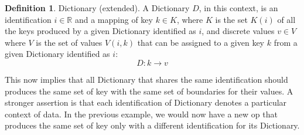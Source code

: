 \documentclass[12pt]{article}
\theoremstyle{definition}
\newtheorem{definition}{Definition}[section]
\theoremstyle{definition}
\theoremstyle{remark}
\begin{document}
\theoremstyle{definition}
\begin{definition}{Dictionary (extended).} A Dictionary $D$, in this context, is an identification $i \in \mathbb{R}$ and a mapping of key $k \in K$, where $K$ is the set $K(i)$ of all the keys produced by a given Dictionary identified as $i$, and discrete values $v \in V$ where $V$ is the set of values $V(i, k)$ that can be assigned to a given key $k$ from a given Dictionary identified as $i$:
$$D: k \to v$$
\end{definition}

This now implies that all Dictionary that shares the same identification should produces the same set of key with the same set of boundaries for their values. A stronger assertion is that each identification of Dictionary denotes a particular context of data. In the previous example, we would now have a new \gls{op} that produces the same set of key only with a different identification for its Dictionary.







\end{document}
